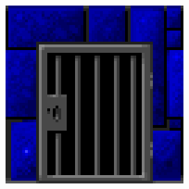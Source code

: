    \begin{minipage}{.5\textwidth} 
     \includegraphics[width=\textwidth]{imgs/wall_texturw.png} 
   \end{minipage}

\par


